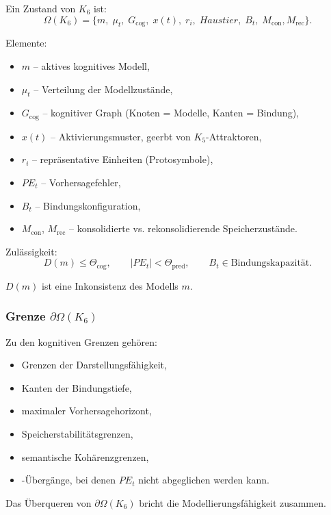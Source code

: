 Ein Zustand von $K_6$ ist:
\[
\Omega(K_6) =
\{
m,\; \mu_t,\; G_{\mathrm{cog}},\;
x(t),\; r_i,\;
Haustier,\; B_t,\;
M_{\mathrm{con}}, M_{\mathrm{rec}}
\}.
\]

Elemente:
\begin{itemize}
    \item $m$ – aktives kognitives Modell,
    \item $\mu_t$ – Verteilung der Modellzustände,
    \item $G_{\mathrm{cog}}$ – kognitiver Graph (Knoten = Modelle, Kanten = Bindung),
    \item $x(t)$ – Aktivierungsmuster, geerbt von $K_5$-Attraktoren,
    \item $r_i$ – repräsentative Einheiten (Protosymbole),
    \item $PE_t$ – Vorhersagefehler,
    \item $B_t$ – Bindungskonfiguration,
    \item $M_{\mathrm{con}}$, $M_{\mathrm{rec}}$ – konsolidierte vs. rekonsolidierende Speicherzustände.
\end{itemize}

Zulässigkeit:
\[
D(m) \le \Theta_{\mathrm{cog}}, \qquad
|PE_t| < \Theta_{\mathrm{pred}}, \qquad
B_t \in \text{Bindungskapazität}.
\]

$D(m)$ ist eine Inkonsistenz des Modells $m$.

\subsubsection{Grenze \texorpdfstring{$\partial\Omega(K_6)$}{\partial\Omega(K_6)}}

Zu den kognitiven Grenzen gehören:
\begin{itemize}
    \item Grenzen der Darstellungsfähigkeit,
    \item Kanten der Bindungstiefe,
    \item maximaler Vorhersagehorizont,
    \item Speicherstabilitätsgrenzen,
    \item semantische Kohärenzgrenzen,
    \item-Übergänge, bei denen $PE_t$ nicht abgeglichen werden kann.
\end{itemize}

Das Überqueren von $\partial \Omega(K_6)$ bricht die Modellierungsfähigkeit zusammen.


